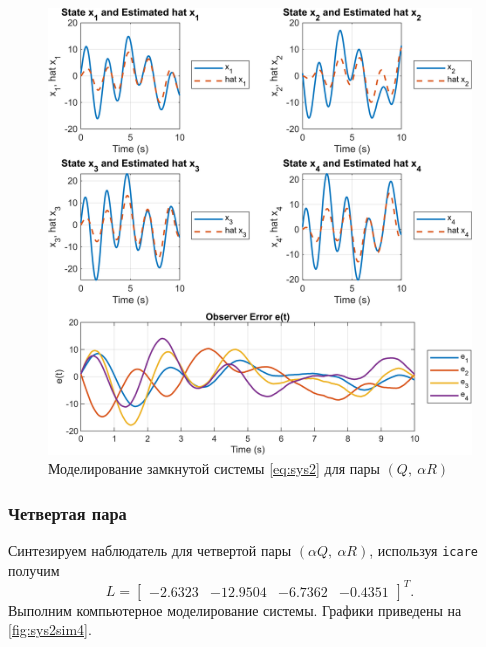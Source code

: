 \begin{figure}[H]
    \centering
    \includegraphics[width=1\linewidth]{figs/2_sim3.png}
    \caption{Моделирование замкнутой системы \eqref{eq:sys2} для пары $(Q,\ \alpha  R )$}
    \label{fig:sys2sim3}
\end{figure}

\newpage\subsubsection{Четвертая пара}

Синтезируем наблюдатель для четвертой пары $(\alpha Q,\ \alpha R)$, используя \texttt{icare} получим
\begin{equation*}
    L=\begin{bmatrix}
        -2.6323&
        -12.9504&
         -6.7362&
         -0.4351
    \end{bmatrix}^T.
\end{equation*}
Выполним компьютерное моделирование системы. Графики приведены на \autoref{fig:sys2sim4}.

